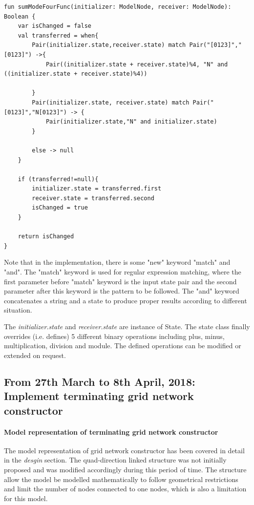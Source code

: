 \begin{lstlisting}[caption = {Implementation for transition function of sum (mod 4) protocol}, style = mykotlin]
fun sumModeFourFunc(initializer: ModelNode, receiver: ModelNode): Boolean {
    var isChanged = false
    val transferred = when{
        Pair(initializer.state,receiver.state) match Pair("[0123]","[0123]") ->{
            Pair((initializer.state + receiver.state)%4, "N" and ((initializer.state + receiver.state)%4))

        }
        Pair(initializer.state, receiver.state) match Pair("[0123]","N[0123]") -> {
            Pair(initializer.state,"N" and initializer.state)
        }

        else -> null
    }

    if (transferred!=null){
        initializer.state = transferred.first
        receiver.state = transferred.second
        isChanged = true
    }

    return isChanged
}\end{lstlisting}
\par\noindent
Note that in the implementation, there is some "new" keyword "match" and "and". The "match" keyword is used for regular expression matching,
where the first parameter before "match" keyword is the input state pair and the second parameter after this keyword is the pattern to be followed.
The "and" keyword concatenates a string and a state to produce proper results according to different situation.
\par\noindent
The \textit{initializer.state} and \textit{receiver.state} are instance of State.
The state class finally overrides (i.e. defines) 5 different binary operations including plus, minus, multiplication, division and module. The
defined operations can be modified or extended on request.

\subsection{From 27th March to 8th April, 2018: Implement terminating grid network constructor}
\paragraph{Model representation of terminating grid network constructor}
The model representation of grid network constructor has been covered in detail in the \textit{desgin} section. The
quad-direction linked structure was not initially proposed and was modified accordingly during this period of time.
The structure allow the model be modelled mathematically to follow geometrical restrictions
and limit the number of nodes connected to one nodes, which is also a limitation for this model.
